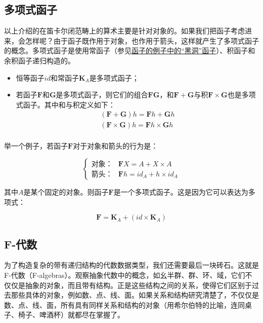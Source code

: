 \documentclass{article}
\begin{document}
\subsection{多项式函子}
\label{sec:polynomial-functors}

以上介绍的在笛卡尔闭范畴上的算术主要是针对对象的。如果我们把函子考虑进来，会怎样呢？由于函子既作用于对象，也作用于箭头，这样就产生了多项式函子的概念。多项式函子是使用常函子（参见\hyperref[sec:functor:examples]{函子的例子中的“黑洞”函子}）、积函子和余积函子递归构造的。

\begin{itemize}
  \item 恒等函子$id$和常函子$\mathbf{K}_A$是多项式函子；
  \item 若函子$\mathbf{F}$和$\mathbf{G}$是多项式函子，则它们的组合$\mathbf{FG}$，和$\mathbf{F} + \mathbf{G}$与积$\mathbf{F} \times \mathbf{G}$也是多项式函子。其中和与积定义如下：
  \[
    \begin{array}{l}
    (\mathbf{F} + \mathbf{G}) h = \mathbf{F} h + \mathbf{G} h \\
    (\mathbf{F} \times \mathbf{G}) h = \mathbf{F} h \times \mathbf{G} h \\
    \end{array}
  \]
\end{itemize}

举一个例子，若函子$\mathbf{F}$对于对象和箭头的行为是：

\[
\begin{cases}
\text{对象：} & \mathbf{F} X = A + X \times A \\
\text{箭头：} & \mathbf{F} h = id_A + h \times id_A
\end{cases}
\]

其中$A$是某个固定的对象。则函子$\mathbf{F}$是一个多项式函子。这是因为它可以表达为多项式：

\[
\mathbf{F} = \mathbf{K}_A + (id \times \mathbf{K}_A)
\]

\subsection{F-代数}

为了构造复杂的带有递归结构的代数数据类型，我们还需要最后一块砖石。这就是F-代数（F-algebras）。观察抽象代数中的概念，如幺半群、群、环、域，它们不仅仅是抽象的对象，而且带有结构。正是这些结构之间的关系，使得它们区别于过去那些具体的对象，例如数、点、线、面。如果关系和结构研究清楚了，不仅仅是数、点、线、面，所有具有同样关系和结构的对象（用希尔伯特的比喻，连同桌子、椅子、啤酒杯）就都尽在掌握了。
\end{document}
